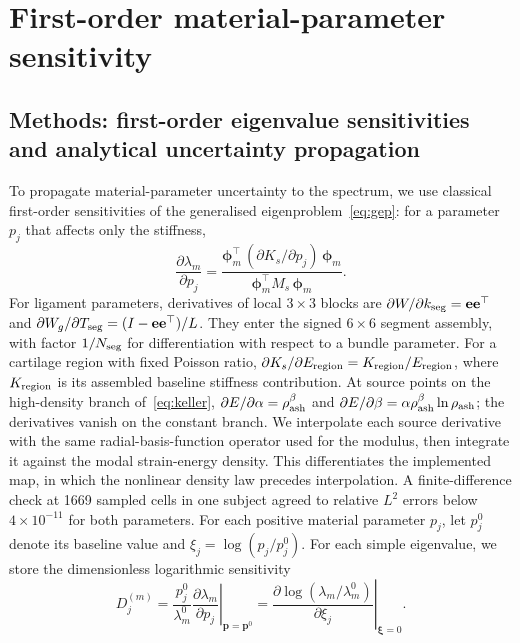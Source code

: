 \documentclass[pdflatex,sn-basic]{sn-jnl}
\begin{document}
\section{First-order material-parameter sensitivity}\label{app:uq}
\subsection{Methods: first-order eigenvalue sensitivities and analytical uncertainty propagation}
\label{sec:sensitivities}

To propagate material-parameter uncertainty to the spectrum, we use classical first-order sensitivities of the generalised eigenproblem~\eqref{eq:gep}: for a parameter $p_j$ that affects only the stiffness,
\begin{equation}
\frac{\partial\lambda_m}{\partial p_j}
=\frac{\boldsymbol\phi_m^\top\,(\partial K_s/\partial p_j)\,\boldsymbol\phi_m}
{\boldsymbol\phi_m^\top M_s\,\boldsymbol\phi_m}.
\label{eq:ev-sensitivity}
\end{equation}
For ligament parameters, derivatives of local $3\times3$ blocks are $\partial W/\partial k_{\rm seg}=\mathbf e\mathbf e^\top$ and $\partial W_g/\partial T_{\rm seg}=(I-\mathbf e\mathbf e^\top)/L$. They enter the signed $6\times6$ segment assembly, with factor $1/N_{\rm seg}$ for differentiation with respect to a bundle parameter.
For a cartilage region with fixed Poisson ratio, $\partial K_s/\partial E_{\rm region}=K_{\rm region}/E_{\rm region}$, where $K_{\rm region}$ is its assembled baseline stiffness contribution.
At source points on the high-density branch of~\eqref{eq:keller}, $\partial E/\partial\alpha=\rho_{\rm ash}^{\beta}$ and $\partial E/\partial\beta=\alpha\rho_{\rm ash}^{\beta}\ln\rho_{\rm ash}$; the derivatives vanish on the constant branch. We interpolate each source derivative with the same radial-basis-function operator used for the modulus, then integrate it against the modal strain-energy density. This differentiates the implemented map, in which the nonlinear density law precedes interpolation. A finite-difference check at 1669 sampled cells in one subject agreed to relative $L^2$ errors below $4\times10^{-11}$ for both parameters.
For each positive material parameter $p_j$, let $p_j^0$ denote its baseline value and $\xi_j=\log(p_j/p_j^0)$. For each simple eigenvalue, we store the dimensionless logarithmic sensitivity
\begin{equation}
D_j^{(m)}=\frac{p_j^0}{\lambda_m^0}\left.\frac{\partial\lambda_m}{\partial p_j}\right|_{\mathbf p=\mathbf p^0}=\left.\frac{\partial\log(\lambda_m/\lambda_m^0)}{\partial\xi_j}\right|_{\boldsymbol\xi=0}.
\end{equation}
\end{document}
